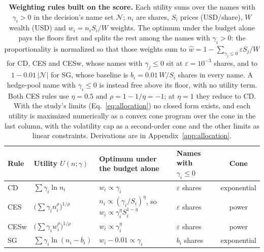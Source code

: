 \begin{table}[H]
\centering
\small
\caption{\textbf{Weighting rules built on the score.} Each utility sums over the names with $\gamma_i > 0$ in the
decision's name set $\mathcal{N}$; $n_i$ are shares, $S_i$ prices (USD/share), $W$ wealth (USD) and
$w_i = n_i S_i / W$ weights. The optimum under the budget alone pays the floors first and splits the rest among the
names with $\gamma_i > 0$: the proportionality is normalized so that those weights sum to
$\hat w = 1 - \sum_{\gamma_j \le 0} \varepsilon S_j / W$ for CD, CES and CESw, whose names with $\gamma_j \le 0$ sit at
$\varepsilon = 10^{-3}$ shares, and to $1 - 0.01\,\lvert\mathcal{N}\rvert$ for SG, whose baseline is
$b_i = 0.01\,W/S_i$ shares in every name. A hedge-pool name with $\gamma_i \le 0$ is instead free above its floor,
with no utility term. Both CES rules use $\eta = 0.5$ and $\rho = 1 - 1/\eta = -1$; at
$\eta = 1$ they reduce to CD. With the study's limits (Eq.~\ref{eq:allocation}) no closed form exists, and each
utility is maximized numerically as a convex cone program over the cone in the last column, with the volatility cap
as a second-order cone and the other limits as linear constraints. Derivations are in
Appendix~\ref{app:allocation}.}
\label{tab:utilities}
\begin{tabular}{@{}llllc@{}}
\toprule
Rule & Utility $U(n;\gamma)$ & Optimum under the budget alone & Names with $\gamma_i \le 0$ & Cone \\
\midrule
CD   & $\sum \gamma_i \ln n_i$
     & $w_i \propto \gamma_i$
     & $\varepsilon$ shares & exponential \\
CES  & $\big(\sum \gamma_i n_i^{\rho}\big)^{1/\rho}$
     & $n_i \propto (\gamma_i/S_i)^{\eta}$, so $w_i \propto \gamma_i^{\eta} S_i^{1-\eta}$
     & $\varepsilon$ shares & power \\
CESw & $\big(\sum \gamma_i w_i^{\rho}\big)^{1/\rho}$
     & $w_i \propto \gamma_i^{\eta}$
     & $\varepsilon$ shares & power \\
SG   & $\sum \gamma_i \ln (n_i - b_i)$
     & $w_i - 0.01 \propto \gamma_i$
     & $b_i$ shares & exponential \\
\bottomrule
\end{tabular}
\end{table}
